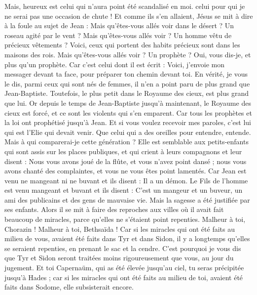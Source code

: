 \begin{multicols}{2}
Mais, heureux est celui qui n'aura point été scandalisé en moi.
celui pour qui je ne serai pas une occasion de chute !
Et comme ils s'en allaient, Jésus se mit à dire à la foule au sujet de Jean : Mais qu'êtes-vous allés voir dans le désert ? Un roseau agité par le vent ?
Mais qu'êtes-vous allés voir ? Un homme vêtu de précieux vêtements ? Voici, ceux qui portent des habits précieux sont dans les maisons des rois.
Mais qu'êtes-vous allés voir ? Un prophète ? Oui, vous dis-je, et plus qu'un prophète.
Car c'est celui dont il est écrit : Voici, j'envoie mon messager devant ta face, pour préparer ton chemin devant toi.
En vérité, je vous le dis, parmi ceux qui sont nés de femmes, il n'en a point paru de plus grand que Jean-Baptiste. Toutefois, le plus petit dans le Royaume des cieux, est plus grand que lui.
Or depuis le temps de Jean-Baptiste jusqu'à maintenant, le Royaume des cieux est forcé, et ce sont les violents qui s'en emparent.
Car tous les prophètes et la loi ont prophétisé jusqu'à Jean.
Et si vous voulez recevoir mes paroles, c'est lui qui est l'Elie qui devait venir.
Que celui qui a des oreilles pour entendre, entende.
Mais à qui comparerai-je cette génération ? Elle est semblable aux petits-enfants qui sont assis sur les places publiques, et qui crient à leurs compagnons
et leur disent : Nous vous avons joué de la flûte, et vous n'avez point dansé ; nous vous avons chanté des complaintes, et vous ne vous êtes point lamentés.
Car Jean est venu ne mangeant ni ne buvant et ils disent : Il a un démon.
Le Fils de l'homme est venu mangeant et buvant et ils disent : C'est un mangeur et un buveur, un ami des publicains et des gens de mauvaise vie. Mais la sagesse a été justifiée par ses enfants.
Alors il se mit à faire des reproches aux villes où il avait fait beaucoup de miracles, parce qu'elles ne s'étaient point repenties.
Malheur à toi, Chorazin ! Malheur à toi, Bethsaïda ! Car si les miracles qui ont été faits au milieu de vous, avaient été faits dans Tyr et dans Sidon, il y a longtemps qu'elles se seraient repenties, en prenant le sac et la cendre.
C'est pourquoi je vous dis que Tyr et Sidon seront traitées moins rigoureusement que vous, au jour du jugement.
Et toi Capernaüm, qui as été élevée jusqu'au ciel, tu seras précipitée jusqu'à Hades ; car si les miracles qui ont été faits au milieu de toi, avaient été faits dans Sodome, elle subsisterait encore.

\end{multicols}
